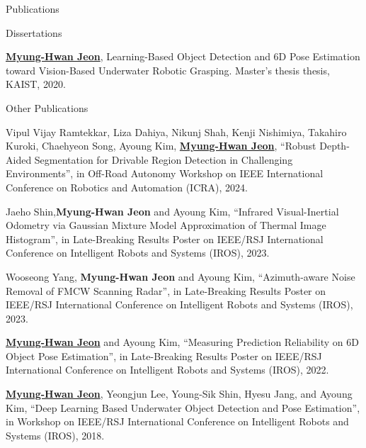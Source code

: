 \begin{rSection}{Publications}
\begin{pubSubsection}{Dissertations}
  \item \underline{\textbf{Myung-Hwan Jeon}}, Learning-Based Object Detection and 6D Pose Estimation toward Vision-Based Underwater Robotic Grasping. Master's thesis thesis, \acf{KAIST}, 2020.
  
\end{pubSubsection}

\begin{pubSubsection}{Other Publications}

  \item Vipul Vijay Ramtekkar, Liza Dahiya, Nikunj Shah, Kenji Nishimiya, Takahiro Kuroki, Chaehyeon Song, Ayoung Kim, \underline{\textbf{Myung-Hwan Jeon}}, “Robust Depth-Aided Segmentation for Drivable Region Detection in Challenging Environments”, in Off-Road Autonomy Workshop on IEEE International Conference on Robotics and Automation (ICRA), 2024.    

  \item Jaeho Shin,\textbf{Myung-Hwan Jeon} and Ayoung Kim, “Infrared Visual-Inertial Odometry via Gaussian Mixture Model Approximation of Thermal Image Histogram”, in Late-Breaking Results Poster on IEEE/RSJ International Conference on Intelligent Robots and Systems (IROS), 2023.  
  
  \item Wooseong Yang, \textbf{Myung-Hwan Jeon} and Ayoung Kim, “Azimuth-aware Noise Removal of FMCW Scanning Radar”, in Late-Breaking Results Poster on IEEE/RSJ International Conference on Intelligent Robots and Systems (IROS), 2023.  

  \item \underline{\textbf{Myung-Hwan Jeon}} and Ayoung Kim, “Measuring Prediction Reliability on 6D Object Pose Estimation”, in Late-Breaking Results Poster on IEEE/RSJ International Conference on Intelligent Robots and Systems (IROS), 2022.  

  \item \underline{\textbf{Myung-Hwan Jeon}}, Yeongjun Lee, Young-Sik Shin, Hyesu Jang, and Ayoung Kim, “Deep Learning Based Underwater Object Detection and Pose Estimation”, in Workshop on IEEE/RSJ International Conference on Intelligent Robots and Systems (IROS), 2018.

\end{pubSubsection} 





\end{rSection}

